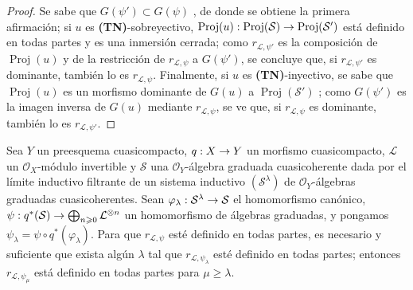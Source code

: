 \documentclass[oneside,10pt]{amsart}
\makeatletter
\renewcommand{\geq}{\geqslant}
\newcommand{\ega@arrow}[2]{\mathchoice{#1}{#2}{#2}{#2}}
\renewcommand{\to}{\ega@arrow{\longrightarrow}{\rightarrow}}
\let\EGAOriginalLabel\label
\renewcommand{\label}[1]{\phantomsection\EGAOriginalLabel{#1}}
\makeatother
\begin{document}
\begin{proof}
Se sabe que $G(\psi')\subset G(\psi)$ , de donde se obtiene la primera afirmación;
si $u$ es \textbf{(TN)}-sobreyectivo, $\operatorname{Proj}(u):\operatorname{Proj}(\mathcal{S})\to
\operatorname{Proj}(\mathcal{S}')$ está definido en todas partes y es una inmersión cerrada;
como $r_{\mathcal{L},\psi'}$ es la composición de $\operatorname{Proj}(u)$ y de la restricción de $r_{\mathcal{L},\psi}$ a $G(\psi')$, se concluye que, si $r_{\mathcal{L},\psi'}$ es dominante, también lo es $r_{\mathcal{L},\psi}$.
Finalmente, si $u$ es \textbf{(TN)}-inyectivo, se sabe que $\operatorname{Proj}(u)$ es un morfismo dominante de $G(u)$ a $\operatorname{Proj}(\mathcal{S}')$ ;
como $G(\psi')$ es la imagen inversa de $G(u)$ mediante $r_{\mathcal{L},\psi}$, se ve que, si $r_{\mathcal{L},\psi}$ es dominante, también lo es $r_{\mathcal{L},\psi'}$.
\end{proof}

\begin{proposition}[3.7.7]
\label{II.3.7.7-fr}
Sea $Y$ un preesquema cuasicompacto, $q:X\to Y$ un morfismo cuasicompacto, $\mathcal{L}$ un $\mathcal{O}_X$-módulo invertible y $\mathcal{S}$ una $\mathcal{O}_Y$-álgebra graduada cuasicoherente dada por el límite inductivo filtrante de un sistema inductivo $(\mathcal{S}^\lambda)$ de $\mathcal{O}_Y$-álgebras graduadas cuasicoherentes.
Sean $\varphi_\lambda:\mathcal{S}^\lambda\to\mathcal{S}$ el homomorfismo canónico, $\psi:q^*(\mathcal{S})\to\bigoplus_{n\geq0}\mathcal{L}^{\otimes n}$ un homomorfismo de álgebras graduadas, y pongamos $\psi_\lambda=\psi\circ q^*(\varphi_\lambda)$.
Para que $r_{\mathcal{L},\psi}$ esté definido en todas partes, es necesario y suficiente que exista algún $\lambda$ tal que $r_{\mathcal{L},\psi_\lambda}$ esté definido en todas partes;
entonces $r_{\mathcal{L},\psi_\mu}$ está definido en todas partes para $\mu\geq\lambda$.
\end{proposition}
\end{document}
